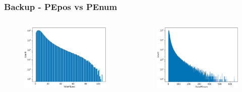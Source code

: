 \documentclass{beamer}
\begin{document}
\begin{frame}[noframenumbering]
\thispagestyle{empty}
\frametitle{Backup - PEpos vs PEnum}
\begin{columns}
\begin{figure}
    \centering
    \includegraphics[width=1.0\linewidth]{img/pepos.png}
\end{figure}
\begin{figure}
    \centering
    \includegraphics[width=1.0\linewidth]{img/penum.png}
\end{figure}
\end{columns}
\end{frame}
\end{document}
